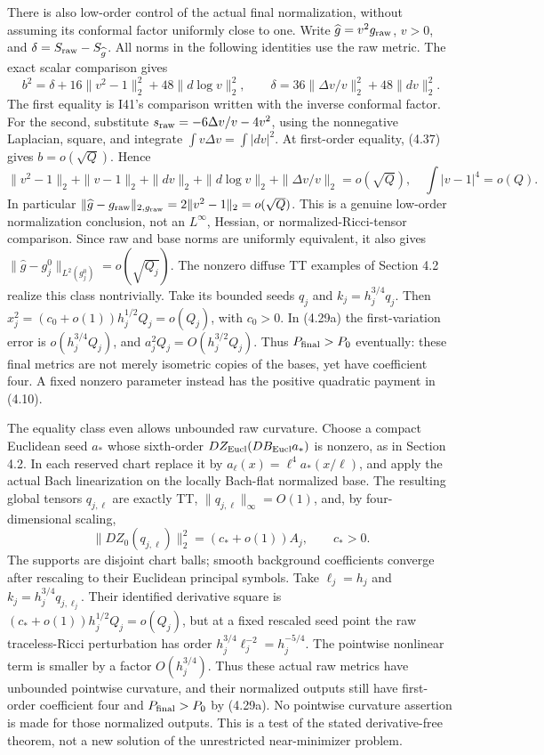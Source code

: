 \documentclass[
  11pt,
]{article}
\begin{document}
There is also low-order control of the actual final normalization,
without assuming its conformal factor uniformly close to one. Write
\(\widehat g=v^2g_{\rm raw}\), \(v>0\), and
\(\delta=S_{\rm raw}-S_{\widehat g}\). All norms in the following
identities use the raw metric. The exact scalar comparison gives \[
 b^2=\delta+16\|v^2-1\|_2^2
                       +48\|d\log v\|_2^2,\qquad
 \delta=36\|\Delta v/v\|_2^2+48\|dv\|_2^2. \tag{4.40a}
\] The first equality is I41's comparison written with the inverse
conformal factor. For the second, substitute
\(s_{\rm raw}=-6\Delta v/v-4v^2\), using the nonnegative Laplacian,
square, and integrate \(\int v\Delta v=\int|dv|^2\). At first-order
equality, (4.37) gives \(b=o(\sqrt Q)\). Hence \[
 \|v^2-1\|_2+\|v-1\|_2+\|dv\|_2+
       \|d\log v\|_2+\|\Delta v/v\|_2=o(\sqrt Q),
 \quad \int|v-1|^4=o(Q). \tag{4.40b}
\] In particular
\(\|\widehat g-g_{\rm raw}\|_{2,g_{\rm raw}} =2\|v^2-1\|_2=o(\sqrt Q)\).
This is a genuine low-order normalization conclusion, not an
\(L^\infty\), Hessian, or normalized-Ricci-tensor comparison. Since raw
and base norms are uniformly equivalent, it also gives
\(\|\widehat g-g_j^0\|_{L^2(g_j^0)}=o(\sqrt{Q_j})\). The nonzero diffuse
TT examples of Section 4.2 realize this class nontrivially. Take its
bounded seeds \(q_j\) and \(k_j=h_j^{3/4}q_j\). Then
\(x_j^2=(c_0+o(1))h_j^{1/2}Q_j=o(Q_j)\), with \(c_0>0\). In (4.29a) the
first-variation error is \(o(h_j^{3/4}Q_j)\), and
\(a_j^2Q_j=O(h_j^{3/2}Q_j)\). Thus \(P_{\rm final}>P_0\) eventually:
these final metrics are not merely isometric copies of the bases, yet
have coefficient four. A fixed nonzero parameter instead has the
positive quadratic payment in (4.10).

The equality class even allows unbounded raw curvature. Choose a compact
Euclidean seed \(a_*\) whose sixth-order
\(DZ_{\rm Eucl}(DB_{\rm Eucl}a_*)\) is nonzero, as in Section 4.2. In
each reserved chart replace it by \(a_\ell(x)=\ell^4a_*(x/\ell)\), and
apply the actual Bach linearization on the locally Bach-flat normalized
base. The resulting global tensors \(q_{j,\ell}\) are exactly TT,
\(\|q_{j,\ell}\|_\infty=O(1)\), and, by four-dimensional scaling, \[
 \|DZ_0(q_{j,\ell})\|_2^2=(c_*+o(1))A_j,\qquad c_*>0.
\] The supports are disjoint chart balls; smooth background coefficients
converge after rescaling to their Euclidean principal symbols. Take
\(\ell_j=h_j\) and \(k_j=h_j^{3/4}q_{j,\ell_j}\). Their identified
derivative square is \((c_*+o(1))h_j^{1/2}Q_j=o(Q_j)\), but at a fixed
rescaled seed point the raw traceless-Ricci perturbation has order
\(h_j^{3/4}\ell_j^{-2}=h_j^{-5/4}\). The pointwise nonlinear term is
smaller by a factor \(O(h_j^{3/4})\). Thus these actual raw metrics have
unbounded pointwise curvature, and their normalized outputs still have
first-order coefficient four and \(P_{\rm final}>P_0\) by (4.29a). No
pointwise curvature assertion is made for those normalized outputs. This
is a test of the stated derivative-free theorem, not a new solution of
the unrestricted near-minimizer problem.
\end{document}
